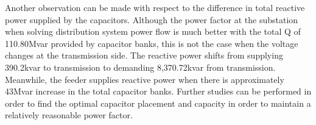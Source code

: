 \documentclass{article}
\begin{document}
Another observation can be made with respect to the difference in total reactive power supplied by the capacitors. Although the power factor at the substation when solving distribution system power flow is much better with the total Q of 110.80Mvar provided by capacitor banks, this is not the case when the voltage changes at the transmission side. The reactive power shifts from supplying 390.2kvar to transmission to demanding 8,370.72kvar from transmission. Meanwhile, the feeder supplies reactive power when there is approximately 43Mvar increase in the total capacitor banks. Further studies can be performed in order to find the optimal capacitor placement and capacity in order to maintain a relatively reasonable power factor. \par

\begin{table}[h]
\caption{Comparison of T\&D co-simulation cases with capacitor banks}
\centering
{}
\label{tab:tdsimulation4}
\end{table}
\end{document}
